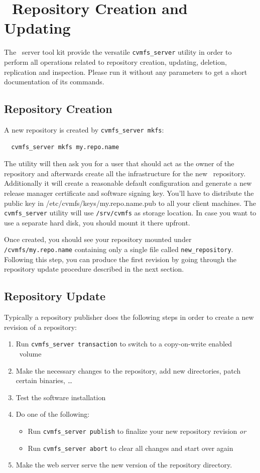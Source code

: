 \section{\cvmfs\ Repository Creation and Updating}
\label{sct:repocreateandupdate}
The \cvmfs\ server tool kit provide the versatile \texttt{cvmfs\_server} utility in order to perform all operations related to repository creation, updating, deletion, replication and inspection.
Please run it without any parameters to get a short documentation of its commands.

\subsection{Repository Creation}
\label{sct:repocreation}

A new repository is created by \texttt{cvmfs\_server mkfs}:
\begin{verbatim}
  cvmfs_server mkfs my.repo.name
\end{verbatim}
The utility will then ask you for a user that should act as the owner of the repository and afterwards create all the infrastructure for the new \cvmfs\ repository.
Additionally it will create a reasonable default configuration and generate a new release manager certificate and software signing key. 
You'll have to distribute the public key in /etc/cvmfs/keys/my.repo.name.pub to all your client machines.
The \texttt{cvmfs\_server} utility will use \texttt{/srv/cvmfs} as storage location.
In case you want to use a separate hard disk, you should mount it there upfront.

Once created, you should see your repository mounted under \texttt{/cvmfs/my.repo.name} containing only a single file called \texttt{new\_repository}.
Following this step, you can produce the first revision by going through the repository update procedure described in the next section.

\subsection{Repository Update}
\label{sct:repoupdateprocedure}
Typically a repository publisher does the following steps in order to create a new revision of a repository:
\begin{enumerate}
	\item Run \texttt{cvmfs\_server transaction} to switch to a copy-on-write enabled \cvmfs\ volume
	\item Make the necessary changes to the repository, \eg add new directories, patch certain binaries, \dots
	\item Test the software installation
	\item Do one of the following:
	\begin{itemize}
		\item Run \texttt{cvmfs\_server publish} to finalize your new repository revision \emph{or}
		\item Run \texttt{cvmfs\_server abort} to clear all changes and start over again
	\end{itemize}
	\item Make the web server serve the new version of the repository directory.
\end{enumerate}

